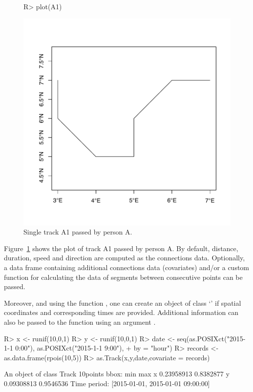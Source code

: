 \documentclass[article]{jss}
\newcommand{\class}[1]{`\code{#1}'}
\begin{document}
\begin{figure}[!h]
\begin{center}
\begin{Sinput}
R> plot(A1)
\end{Sinput}
\includegraphics{article-006}
\end{center}
\caption{Single track A1 passed by person A.}
\label{figA1}
\end{figure}
Figure~\ref{figA1} shows the plot of track A1 passed by person A. By default, distance, duration, speed and direction are computed as the connections data. Optionally, a data frame containing additional connections data (covariates) and/or a custom function for calculating the data of segments between consecutive points can be passed.

Moreover, and using the function , one can create an object of class \class{Track} if spatial coordinates and corresponding times are provided. Additional information can also be passed to the function  using an argument .

\begin{Sinput}
R> x <- runif(10,0,1)
R> y <- runif(10,0,1)
R> date <- seq(as.POSIXct("2015-1-1 0:00"), as.POSIXct("2015-1-1 9:00"),
+                 by = "hour")
R> records <- as.data.frame(rpois(10,5))
R> as.Track(x,y,date,covariate = records)
\end{Sinput}
\begin{Soutput}
An object of class Track 
10points 
bbox: 
         min       max
x 0.23958913 0.8382877
y 0.09308813 0.9546536
Time period: [2015-01-01, 2015-01-01 09:00:00]
\end{Soutput}
\end{document}

